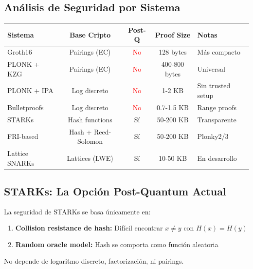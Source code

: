 \documentclass[11pt,a4paper,twoside]{book}
\begin{document}
\subsection{An\'alisis de Seguridad por Sistema}

\begin{center}
\begin{tabular}{lcccl}
\toprule
\textbf{Sistema} & \textbf{Base Cripto} & \textbf{Post-Q} & \textbf{Proof Size} & \textbf{Notas} \\
\midrule
Groth16 & Pairings (EC) & \textcolor{red}{No} & 128 bytes & M\'as compacto \\
PLONK + KZG & Pairings (EC) & \textcolor{red}{No} & 400-800 bytes & Universal \\
PLONK + IPA & Log discreto & \textcolor{red}{No} & 1-2 KB & Sin trusted setup \\
Bulletproofs & Log discreto & \textcolor{red}{No} & 0.7-1.5 KB & Range proofs \\
\midrule
STARKs & Hash functions & \textcolor{green!50!black}{S\'i} & 50-200 KB & Transparente \\
FRI-based & Hash + Reed-Solomon & \textcolor{green!50!black}{S\'i} & 50-200 KB & Plonky2/3 \\
Lattice SNARKs & Lattices (LWE) & \textcolor{green!50!black}{S\'i} & 10-50 KB & En desarrollo \\
\bottomrule
\end{tabular}
\end{center}

\subsection{STARKs: La Opci\'on Post-Quantum Actual}

\begin{definition}
La seguridad de STARKs se basa \'unicamente en:
\begin{enumerate}
    \item \textbf{Collision resistance de hash:} Dif\'icil encontrar $x \neq y$ con $H(x) = H(y)$
    \item \textbf{Random oracle model:} Hash se comporta como funci\'on aleatoria
\end{enumerate}

No depende de logaritmo discreto, factorizaci\'on, ni pairings.
\end{definition}
\end{document}
